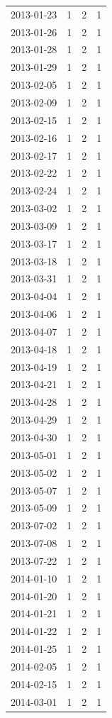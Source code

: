 \begin{tabular}{lrrr}
2013-01-23 & 1 & 2 & 1 \\
2013-01-26 & 1 & 2 & 1 \\
2013-01-28 & 1 & 2 & 1 \\
2013-01-29 & 1 & 2 & 1 \\
2013-02-05 & 1 & 2 & 1 \\
2013-02-09 & 1 & 2 & 1 \\
2013-02-15 & 1 & 2 & 1 \\
2013-02-16 & 1 & 2 & 1 \\
2013-02-17 & 1 & 2 & 1 \\
2013-02-22 & 1 & 2 & 1 \\
2013-02-24 & 1 & 2 & 1 \\
2013-03-02 & 1 & 2 & 1 \\
2013-03-09 & 1 & 2 & 1 \\
2013-03-17 & 1 & 2 & 1 \\
2013-03-18 & 1 & 2 & 1 \\
2013-03-31 & 1 & 2 & 1 \\
2013-04-04 & 1 & 2 & 1 \\
2013-04-06 & 1 & 2 & 1 \\
2013-04-07 & 1 & 2 & 1 \\
2013-04-18 & 1 & 2 & 1 \\
2013-04-19 & 1 & 2 & 1 \\
2013-04-21 & 1 & 2 & 1 \\
2013-04-28 & 1 & 2 & 1 \\
2013-04-29 & 1 & 2 & 1 \\
2013-04-30 & 1 & 2 & 1 \\
2013-05-01 & 1 & 2 & 1 \\
2013-05-02 & 1 & 2 & 1 \\
2013-05-07 & 1 & 2 & 1 \\
2013-05-09 & 1 & 2 & 1 \\
2013-07-02 & 1 & 2 & 1 \\
2013-07-08 & 1 & 2 & 1 \\
2013-07-22 & 1 & 2 & 1 \\
2014-01-10 & 1 & 2 & 1 \\
2014-01-20 & 1 & 2 & 1 \\
2014-01-21 & 1 & 2 & 1 \\
2014-01-22 & 1 & 2 & 1 \\
2014-01-25 & 1 & 2 & 1 \\
2014-02-05 & 1 & 2 & 1 \\
2014-02-15 & 1 & 2 & 1 \\
2014-03-01 & 1 & 2 & 1 \\

\end{tabular}

